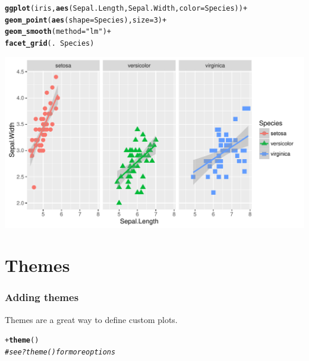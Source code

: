 \documentclass{beamer}\usepackage[]{graphicx}\usepackage[]{color}
\makeatletter
\newcommand{\hlnum}[1]{\textcolor[rgb]{0.686,0.059,0.569}{#1}}%
\newcommand{\hlstr}[1]{\textcolor[rgb]{0.192,0.494,0.8}{#1}}%
\newcommand{\hlcom}[1]{\textcolor[rgb]{0.678,0.584,0.686}{\textit{#1}}}%
\newcommand{\hlopt}[1]{\textcolor[rgb]{0,0,0}{#1}}%
\newcommand{\hlstd}[1]{\textcolor[rgb]{0.345,0.345,0.345}{#1}}%
\newcommand{\hlkwc}[1]{\textcolor[rgb]{0.333,0.667,0.333}{#1}}%
\newcommand{\hlkwd}[1]{\textcolor[rgb]{0.737,0.353,0.396}{\textbf{#1}}}%
\newenvironment{kframe}{%
 \def\at@end@of@kframe{}%
 \ifinner\ifhmode%
  \def\at@end@of@kframe{\end{minipage}}%
  \begin{minipage}{\columnwidth}%
 \fi\fi%
 \def\FrameCommand##1{\hskip\@totalleftmargin \hskip-\fboxsep
 \colorbox{shadecolor}{##1}\hskip-\fboxsep
     \hskip-\linewidth \hskip-\@totalleftmargin \hskip\columnwidth}%
 \MakeFramed {\advance\hsize-\width
   \@totalleftmargin\z@ \linewidth\hsize
   \@setminipage}}%
 {\par\unskip\endMakeFramed%
 \at@end@of@kframe}
\newenvironment{knitrout}{}{} %
\makeatother
\begin{document}
\begin{frame}[fragile]
\begin{knitrout}\footnotesize
{}\color{fgcolor}\begin{kframe}
\begin{alltt}
\hlkwd{ggplot}\hlstd{(iris,} \hlkwd{aes}\hlstd{(Sepal.Length, Sepal.Width,} \hlkwc{color} \hlstd{= Species))} \hlopt{+}
    \hlkwd{geom_point}\hlstd{(}\hlkwd{aes}\hlstd{(}\hlkwc{shape} \hlstd{= Species),} \hlkwc{size} \hlstd{=} \hlnum{3}\hlstd{)} \hlopt{+}
    \hlkwd{geom_smooth}\hlstd{(}\hlkwc{method} \hlstd{=} \hlstr{"lm"}\hlstd{)} \hlopt{+}
    \hlkwd{facet_grid}\hlstd{(.} \hlopt{~} \hlstd{Species)}
\end{alltt}
\end{kframe}

{\centering \includegraphics[width=.75\linewidth]{figure/adding_stats2-1} 

}



\end{knitrout}
\end{frame}


\section*{Themes}
\frame{\sectionpage}


\begin{frame}[fragile]
\frametitle{Adding themes}
Themes are a great way to define custom plots.
\begin{knitrout}\footnotesize
{}\color{fgcolor}\begin{kframe}
\begin{alltt}
\hlopt{+} \hlkwd{theme}\hlstd{()}
\hlcom{# see ?theme() for more options}
\end{alltt}
\end{kframe}
\end{knitrout}
\end{frame}
\end{document}

